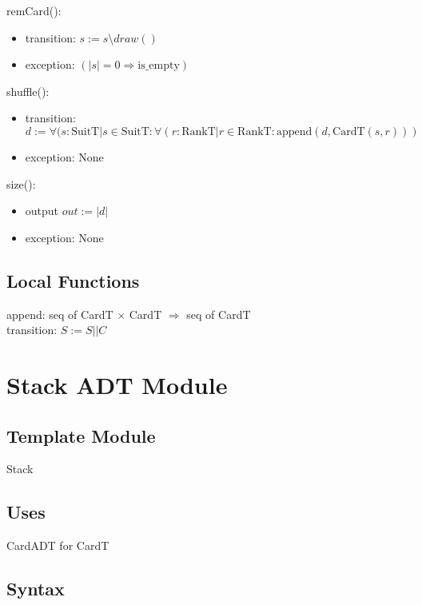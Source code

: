 \documentclass[12pt]{article}
\newcommand{\means}{\Rightarrow}
\begin{document}
\noindent remCard():
\begin{itemize}
  \item transition: $s := s $\textbackslash$ draw()$
  \item exception: $(|s| = 0 \means \mbox{is\_empty})$
\end{itemize}

\noindent shuffle():
\begin{itemize}
    \item transition: $d := \forall (s : \mbox{SuitT} | s \in \mbox{SuitT} : \forall (r : \mbox{RankT} | r \in \mbox{RankT} : \mbox{append}(d,\mbox{CardT}(s,r)))$
    \item exception: None
\end{itemize}

\noindent size():
\begin{itemize}
    \item output $out := |d|$
    \item exception: None
\end{itemize}

\subsection*{Local Functions}

\noindent append: seq of CardT $\times$ CardT $\means$ seq of CardT\\
\noindent transition: $S := S||C$

\newpage

\section*{Stack ADT Module}

\subsection*{Template Module}

Stack

\subsection*{Uses}

CardADT for CardT\\

\subsection*{Syntax}
\end{document}
